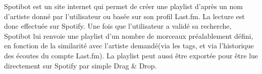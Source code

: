 Spotibot est un site internet qui permet de créer une playlist d'après un nom d'artiste donné par l'utilisateur ou basée sur son profil Last.fm. La lecture est donc effectuée sur Spotify.
Une fois que l'utilisateur a validé sa recherche, Spotibot lui renvoie une playlist d'un nombre de morceaux préalablement défini, en fonction de la similarité avec l'artiste demandé(via les tags, et via l'historique des écoutes du compte Last.fm).
La playlist peut aussi être exportée pour être lue directement sur Spotify par simple Drag & Drop.

